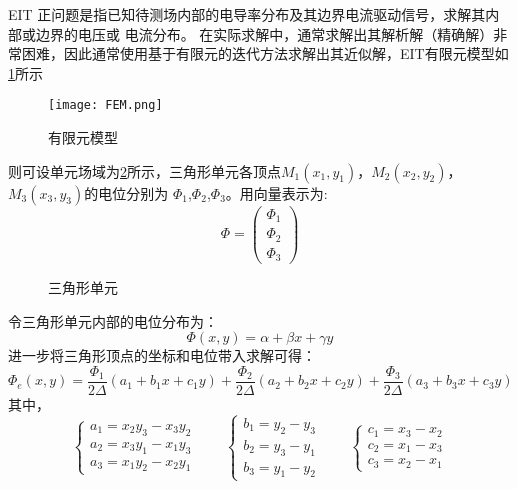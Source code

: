 
EIT 正问题是指已知待测场内部的电导率分布及其边界电流驱动信号，求解其内部或边界的电压或
电流分布。
在实际求解中，通常求解出其解析解（精确解）非常困难，因此通常使用基于有限元的迭代方法求解出其近似解，EIT有限元模型如\cref{figure:FEMa}所示
\begin{figure}[h]
\centering
\texttt{[image: FEM.png]}
\caption{有限元模型}
\label{figure:FEMa}
\end{figure}

则可设单元场域为\cref{figure:fem}所示，三角形单元各顶点$M_1(x_1,y_1)$，$M_2(x_2,y_2)$，$M_3(x_3,y_3)$的电位分别为
$\Phi_1$,$\Phi_2$,$\Phi_3$。用向量表示为:
\[
  \Phi =
  \begin{pmatrix}
  \Phi_1 \\
  \Phi_2 \\
  \Phi_3
  \end{pmatrix}
  \]
\begin{figure}[htbp]
    \centering
    
  \caption{三角形单元}
  \label{figure:fem}
\end{figure}
令三角形单元内部的电位分布为：
\begin{equation}
  \Phi(x,y) = \alpha + \beta x + \gamma y 
\end{equation}
进一步将三角形顶点的坐标和电位带入求解可得：
\begin{equation}
  \Phi_e(x,y) = \frac{\Phi_1}{2\Delta}(a_1+b_1x+c_1y) + \frac{\Phi_2}{2\Delta}(a_2+b_2x+c_2y) + \frac{\Phi_3}{2\Delta}(a_3+b_3x+c_3y)
\end{equation}
其中，
\begin{equation}
  \left\{
  \begin{array}{c}
    a_1 = x_2y_3 - x_3y_2 \\
    a_2 = x_3y_1 - x_1y_3 \\
    a_3 = x_1y_2 - x_2y_1
  \end{array}
  \right.
  \qquad 
  \left\{
    \begin{array}{c}
      b_1 = y_2 - y_3 \\
      b_2 = y_3 - y_1 \\
      b_3 = y_1 - y_2
    \end{array}
    \right.
    \qquad 
    \left\{
      \begin{array}{c}
        c_1 = x_3 - x_2 \\
        c_2 = x_1 - x_3 \\
        c_3 = x_2 - x_1
      \end{array}
      \right.
\end{equation}
